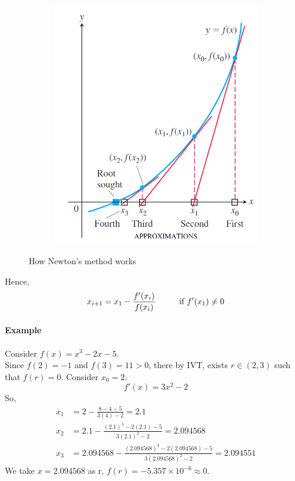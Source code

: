 \documentclass[12pt]{article}
\newcommand\tab[1][1cm]{\hspace*{#1}}
\begin{document}
\begin{figure}[h!]
\begin{subfigure}{0.3\linewidth}
        \includegraphics[width = 1\linewidth]{Images/newton's method 2.png}
    \end{subfigure}
    \caption{How Newton's method works}
\end{figure}
Hence,
\[
    x_{i + 1} = x_1 - \frac{f'(x_i)}{f(x_i)} \textrm{\tab if } f'(x_1) \neq 0  
\]

\paragraph{Example} Consider $f(x) = x^3 - 2x - 5$. \\
Since $f(2) = -1 $ and $f(3) = 11 > 0$, there by IVT, exists $r \in (2, 3)$ such that $f(r) = 0$. Consider $x_0 = 2$.
\[
    f'(x) = 3x^2 - 2
\]
So, 
\begin{align*} 
     x_1 &= 2 - \frac{8 - 4 - 5}{3(4) - 2} = 2.1 \\
     x_2 &= 2.1 - \frac{(2.1)^3 - 2(2.1) - 5}{3(2.1)^2 - 2} = 2.094568 \\ 
     x_3 &= 2.094568 - \frac{(2.094568)^3 - 2(2.094568) - 5}{3(2.094568)^2 - 2} = 2.094551 
\end{align*}
\noindent
We take $x = 2.094568$ as r, $f(r) = -5.357 \times 10^{-6} \approx 0$.
\end{document}
